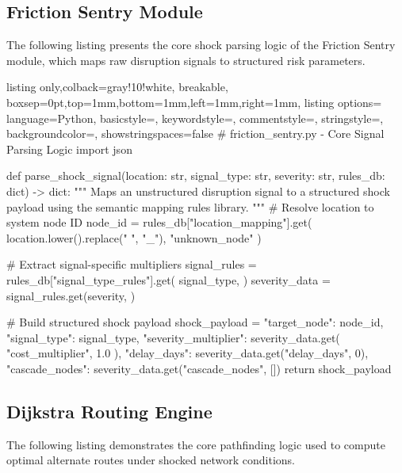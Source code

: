 \subsection{Friction Sentry Module}
The following listing presents the core shock parsing logic of the Friction Sentry module, which maps raw disruption signals to structured risk parameters.

\begin{tcblisting}{listing only,colback=gray!10!white, breakable, boxsep=0pt,top=1mm,bottom=1mm,left=1mm,right=1mm,
listing options={
language=Python,
basicstyle=\small\ttfamily,
keywordstyle=\color{blue},
commentstyle=\color{gray},
stringstyle=\color{red!70!black},
backgroundcolor=\color{gray!10},
showstringspaces=false}}
# friction_sentry.py - Core Signal Parsing Logic
import json

def parse_shock_signal(location: str, signal_type: str,
                        severity: str, rules_db: dict) -> dict:
    """
    Maps an unstructured disruption signal to a structured
    shock payload using the semantic mapping rules library.
    """
    # Resolve location to system node ID
    node_id = rules_db["location_mapping"].get(
        location.lower().replace(" ", "_"),
        "unknown_node"
    )

    # Extract signal-specific multipliers
    signal_rules = rules_db["signal_type_rules"].get(
        signal_type, {}
    )
    severity_data = signal_rules.get(severity, {})

    # Build structured shock payload
    shock_payload = {
        "target_node": node_id,
        "signal_type": signal_type,
        "severity_multiplier": severity_data.get(
            "cost_multiplier", 1.0
        ),
        "delay_days": severity_data.get("delay_days", 0),
        "cascade_nodes": severity_data.get("cascade_nodes", [])
    }
    return shock_payload
\end{tcblisting}

\subsection{Dijkstra Routing Engine}
The following listing demonstrates the core pathfinding logic used to compute optimal alternate routes under shocked network conditions.

